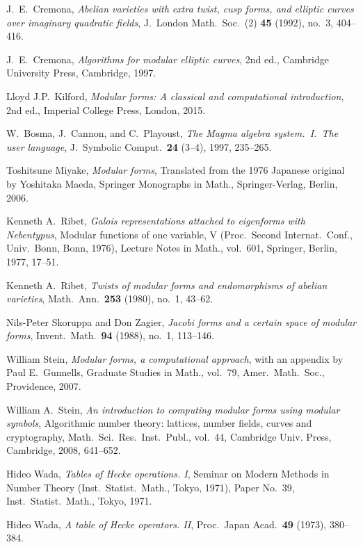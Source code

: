 \documentclass[11pt]{amsart}
\numberwithin{equation}{subsection}
\theoremstyle{plain}
\theoremstyle{definition}
\begin{document}
\begin{thebibliography}{999}

J.\ E.\ Cremona, \emph{Abelian varieties with extra twist, cusp forms, and elliptic curves over imaginary quadratic fields}, J.\ London Math.\ Soc.\ (2) \textbf{45} (1992), no.\ 3, 404--416.

J.\ E.\ Cremona, \emph{Algorithms for modular elliptic curves}, 2nd ed., Cambridge University Press, Cambridge, 1997.

Lloyd J.P.\ Kilford, \emph{Modular forms: A classical and computational introduction}, 2nd ed., Imperial College Press, London, 2015.

W.~Bosma, J.~Cannon, and C.~Playoust, \emph{The Magma algebra system.\ I.\ The user language}, J.\ Symbolic Comput.\ \textbf{24} (3--4), 1997, 235--265.

Toshitsune Miyake, \emph{Modular forms}, Translated from the 1976 Japanese original by Yoshitaka Maeda, Springer Monographs in Math., Springer-Verlag, Berlin, 2006.

Kenneth A.\ Ribet, \emph{Galois representations attached to eigenforms with Nebentypus}, Modular functions of one variable, V (Proc.\ Second Internat.\ Conf., Univ.\ Bonn, Bonn, 1976), Lecture Notes in Math., vol.\ 601, Springer, Berlin, 1977, 17--51.

Kenneth A.\ Ribet, \emph{Twists of modular forms and endomorphisms of abelian varieties}, Math.\ Ann.\ \textbf{253} (1980), no.\ 1, 43--62.

Nils-Peter Skoruppa and Don Zagier, \emph{Jacobi forms and a certain space of modular forms}, Invent.\ Math.\ \textbf{94} (1988), no.\ 1, 113--146.

William Stein, \emph{Modular forms, a computational approach}, with an appendix by Paul E.\ Gunnells, Graduate Studies in Math., vol.~79, Amer.\ Math.\ Soc., Providence, 2007.

William A.\ Stein, \emph{An introduction to computing modular forms using modular symbols}, Algorithmic number theory: lattices, number fields, curves and cryptography, Math.\ Sci.\ Res.\ Inst.\ Publ., vol.\ 44, Cambridge Univ. Press, Cambridge, 2008, 641--652.

Hideo Wada, \emph{Tables of Hecke operations. I}, Seminar on Modern Methods in Number Theory (Inst.\ Statist.\ Math., Tokyo, 1971), Paper No.\ 39, Inst.\ Statist.\ Math., Tokyo, 1971. 

Hideo Wada, \emph{A table of Hecke operators. II}, Proc.\ Japan Acad.\ \textbf{49} (1973), 380--384. 

\end{thebibliography}
\end{document}
